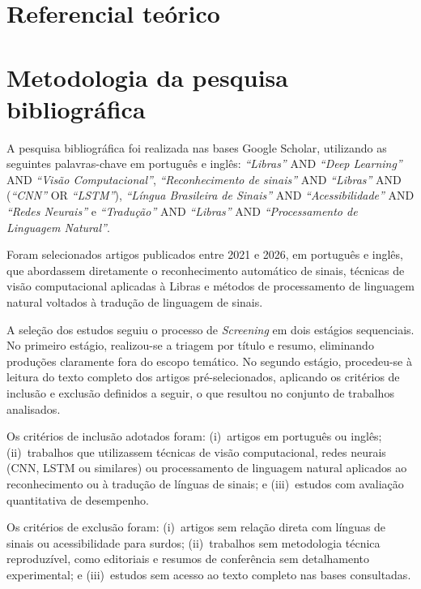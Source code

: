\documentclass[
    12pt,                %
    openright,           %
    oneside,             %
    a4paper,             %
    english,             %
    brazil               %
]{abntex2}
\begin{document}
\section{Referencial teórico}
\label{sec:referencial}


\section{Metodologia da pesquisa bibliográfica}
\label{sec:metodologia_pesquisa}

A pesquisa bibliográfica foi realizada nas bases Google Scholar, utilizando as seguintes palavras-chave em português e inglês: \textit{``Libras''} AND \textit{``Deep Learning''} AND \textit{``Visão Computacional''}, \textit{``Reconhecimento de sinais''} AND \textit{``Libras''} AND (\textit{``CNN''} OR \textit{``LSTM''}), \textit{``Língua Brasileira de Sinais''} AND \textit{``Acessibilidade''} AND \textit{``Redes Neurais''} e \textit{``Tradução''} AND \textit{``Libras''} AND \textit{``Processamento de Linguagem Natural''}.

Foram selecionados artigos publicados entre 2021 e 2026, em português e inglês, que abordassem diretamente o reconhecimento automático de sinais, técnicas de visão computacional aplicadas à Libras e métodos de processamento de linguagem natural voltados à tradução de linguagem de sinais.

A seleção dos estudos seguiu o processo de \textit{Screening} em dois estágios sequenciais. No primeiro estágio, realizou-se a triagem por título e resumo, eliminando produções claramente fora do escopo temático. No segundo estágio, procedeu-se à leitura do texto completo dos artigos pré-selecionados, aplicando os critérios de inclusão e exclusão definidos a seguir, o que resultou no conjunto de trabalhos analisados.

Os critérios de inclusão adotados foram: (i)~artigos em português ou inglês; (ii)~trabalhos que utilizassem técnicas de visão computacional, redes neurais (CNN, LSTM ou similares) ou processamento de linguagem natural aplicados ao reconhecimento ou à tradução de línguas de sinais; e (iii)~estudos com avaliação quantitativa de desempenho.

Os critérios de exclusão foram: (i)~artigos sem relação direta com línguas de sinais ou acessibilidade para surdos; (ii)~trabalhos sem metodologia técnica reproduzível, como editoriais e resumos de conferência sem detalhamento experimental; e (iii)~estudos sem acesso ao texto completo nas bases consultadas.
\end{document}
